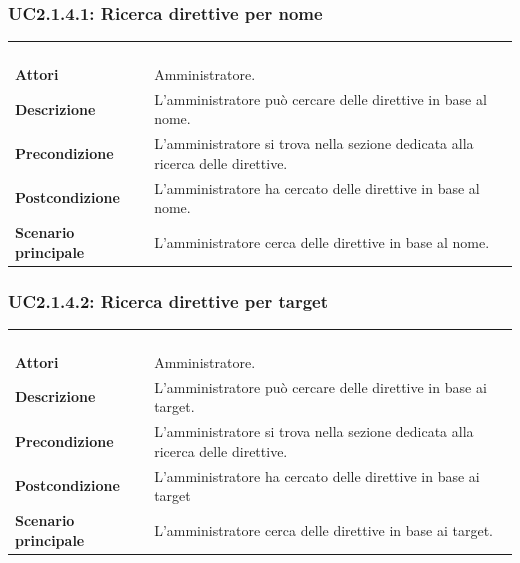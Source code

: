 \subsubsection{UC2.1.4.1: Ricerca direttive per nome}
\label{UC2.1.4.1}
\begin{longtable}{l|p{10cm}}
\rowcolor[gray]{0.8} \multicolumn{2}{c}{} \\
\rowcolor[gray]{0.8} \multicolumn{2}{c}{\textbf{UC2.1.4.1 - Ricerca direttive per nome}} \\
\rowcolor[gray]{0.8} \multicolumn{2}{c}{} \\
\hline
&\\
\textbf{Attori} & Amministratore.\\[7pt]
\textbf{Descrizione} & L'amministratore può cercare delle direttive in base al nome.\\[7pt]
\textbf{Precondizione} & L'amministratore si trova nella sezione dedicata alla ricerca delle direttive.\\[7pt]
\textbf{Postcondizione} & L'amministratore ha cercato delle direttive in base al nome.\\[7pt]
\textbf{Scenario principale} &L'amministratore cerca delle direttive in base al nome.\\[7pt]\hline
\end{longtable}

\subsubsection{UC2.1.4.2: Ricerca direttive per target}
\label{UC2.1.4.2}
\begin{longtable}{l|p{10cm}}
\rowcolor[gray]{0.8} \multicolumn{2}{c}{} \\
\rowcolor[gray]{0.8} \multicolumn{2}{c}{\textbf{UC2.1.4.2 - Ricerca direttive per target}} \\
\rowcolor[gray]{0.8} \multicolumn{2}{c}{} \\
\hline
&\\
\textbf{Attori} & Amministratore.\\[7pt]
\textbf{Descrizione} & L'amministratore può cercare delle direttive in base ai target.\\[7pt]
\textbf{Precondizione} & L'amministratore si trova nella sezione dedicata alla ricerca delle direttive.\\[7pt]
\textbf{Postcondizione} & L'amministratore ha cercato delle direttive in base ai target\\[7pt]
\textbf{Scenario principale} &L'amministratore cerca delle direttive in base ai target.\\[7pt]\hline
\end{longtable}

